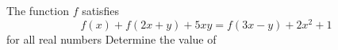 The function $ f$ satisfies \[f(x) + f(2x + y) + 5xy = f(3x - y) + 2x^2 + 1\] for all real numbers   Determine the value of 
